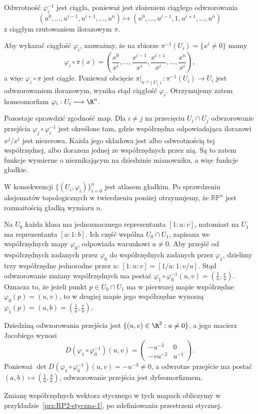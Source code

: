 \begin{przyklad}
Odwrotność $\varphi_i^{-1}$ jest ciągła, ponieważ jest złożeniem
ciągłego odwzorowania
\[
(u^0,\dots,u^{i-1},u^{i+1},\dots,u^n)
\longmapsto
(u^0,\dots,u^{i-1},1,u^{i+1},\dots,u^n)
\]
z ciągłym rzutowaniem ilorazowym $\pi$.

Aby wykazać ciągłość $\varphi_i$, zauważmy, że na zbiorze $\pi^{-1}(U_i)=\{x^i\neq0\}$
mamy
\[
\varphi_i\circ\pi(x)
=
\left(
\frac{x^0}{x^i},
\dots,
\frac{x^{i-1}}{x^i},
\frac{x^{i+1}}{x^i},
\dots,
\frac{x^n}{x^i}
\right),
\]
a więc $\varphi_i\circ\pi$ jest ciągłe. Ponieważ obcięcie $\pi|_{\pi^{-1}(U_i)}: \pi^{-1}(U_i)\longrightarrow U_i$
jest odwzorowaniem ilorazowym, wynika stąd ciągłość $\varphi_i$.
Otrzymujemy zatem homeomorfizm $\varphi_i:U_i\longrightarrow\R^n$.

Pozostaje sprawdzić zgodność map. Dla $i\neq j$ na przecięciu
$U_i\cap U_j$ odwzorowanie przejścia $\varphi_j\circ\varphi_i^{-1}$
jest określone tam, gdzie współrzędna odpowiadająca ilorazowi
$x^j/x^i$ jest niezerowa. Każda jego składowa jest albo odwrotnością
tej współrzędnej, albo ilorazem jednej ze współrzędnych przez nią.
Są to zatem funkcje wymierne o nieznikającym na dziedzinie
mianowniku, a więc funkcje gładkie.

W konsekwencji $\{(U_i,\varphi_i)\}_{i=0}^n$
jest atlasem gładkim. Po sprawdzeniu aksjomatów topologicznych
w twierdzeniu poniżej otrzymujemy, że $\mathbb{RP}^n$ jest
rozmaitością gładką wymiaru $n$.
\end{przyklad}


\begin{przyklad}\label{prz:RP2-przejscie-1}
Na $U_0$ każda klasa ma jednoznacznego reprezentanta $[1:u:v]$,
natomiast na $U_1$ ma reprezentanta $[a:1:b]$.
Ich część wspólna $U_0\cap U_1$, zapisana we współrzędnych mapy
$\varphi_0$, odpowiada warunkowi $u\neq0$. Aby przejść od współrzędnych
zadanych przez $\varphi_0$ do współrzędnych zadanych przez $\varphi_1$,
dzielimy trzy współrzędne jednorodne przez $u$: $[1:u:v] = [1/u:1:v/u]$.
Stąd odwzorowanie zmiany współrzędnych ma postać $\varphi_1\circ\varphi_0^{-1}(u,v) = \left(\frac1u,\frac vu\right)$.
Oznacza to, że jeżeli punkt $p\in U_0\cap U_1$ ma w pierwszej mapie
współrzędne $\varphi_0(p)=(u,v)$,
to w drugiej mapie jego współrzędne wynoszą $\varphi_1(p)=(a,b) = \left(\frac1u,\frac vu\right)$.

Dziedziną odwzorowania przejścia jest $\{(u,v)\in\R^2:u\neq0\}$,
a jego macierz Jacobiego wynosi
\[
D(\varphi_1\circ\varphi_0^{-1})(u,v)
=
\begin{pmatrix}
-u^{-2} & 0\\[1mm]
-vu^{-2} & u^{-1}
\end{pmatrix}.
\]
Ponieważ $\det D(\varphi_1\circ\varphi_0^{-1})(u,v) = -u^{-3}\neq0$,
a odwrotne przejście ma postać $(a,b)\longmapsto \left(\frac1a,\frac ba\right)$,
odwzorowanie przejścia jest dyfeomorfizmem.

Zmianę współrzędnych wektora stycznego w tych mapach obliczymy
w przykładzie~\ref{prz:RP2-styczna-1}, po zdefiniowaniu przestrzeni stycznej.
\end{przyklad}


